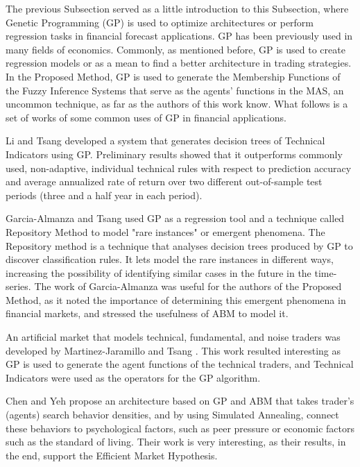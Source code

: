 The previous Subsection served as a little introduction to this Subsection, where Genetic Programming (GP) is used to optimize architectures or perform regression tasks in financial forecast applications. GP has been previously used in many fields of economics. Commonly, as mentioned before, GP is used to create regression models or as a mean to find a better architecture in trading strategies. In the Proposed Method, GP is used to generate the Membership Functions of the Fuzzy Inference Systems that serve as the agents' functions in the MAS, an uncommon technique, as far as the authors of this work know. What follows is a set of works of some common uses of GP in financial applications.

Li and Tsang \cite{Li1999} developed a system that generates decision trees of Technical Indicators using GP. Preliminary results showed that it outperforms commonly used, non-adaptive, individual technical rules with respect to prediction accuracy and average annualized rate of return over two different out-of-sample test periods (three and a half year in each period).

Garcia-Almanza and Tsang \cite{Garcia-Almanza2006} used GP as a regression tool and a technique called Repository Method to model "rare instances" or emergent phenomena. The Repository method is a technique that analyses decision trees produced by GP to discover classification rules. It lets model the rare instances in different ways, increasing the possibility of identifying similar cases in the future in the time-series. The work of Garcia-Almanza was useful for the authors of the Proposed Method, as it noted the importance of determining this emergent phenomena in financial markets, and stressed the usefulness of ABM to model it.

An artificial market that models technical, fundamental, and noise traders was developed by Martinez-Jaramillo and Tsang \cite{Martinez-Jaramillo2009}. This work resulted interesting as GP is used to generate the agent functions of the technical traders, and Technical Indicators were used as the operators for the GP algorithm.

Chen and Yeh \cite{Chen2001} propose an architecture based on GP and ABM that takes trader's (agents) search behavior densities, and by using Simulated Annealing, connect these behaviors to psychological factors, such as peer pressure or economic factors such as the standard of living. Their work is very interesting, as their results, in the end, support the Efficient Market Hypothesis.

